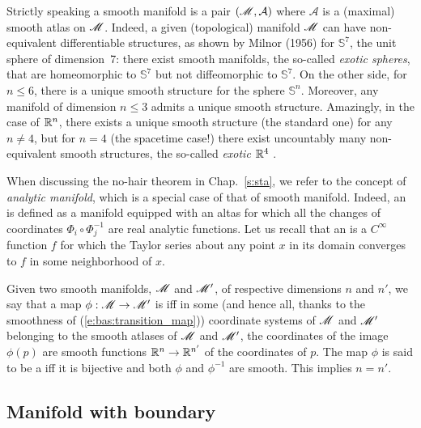 \begin{remark}
Strictly speaking a smooth manifold is a pair $(\mathscr{M},\mathcal{A})$  where
$\mathcal{A}$ is a (maximal) smooth atlas on $\mathscr{M}$.
Indeed, a given (topological) manifold $\mathscr{M}$
can have non-equivalent differentiable structures, as shown by Milnor (1956) \cite{Milno56}
for $\mathbb{S}^7$, the unit sphere of dimension~7: there exist smooth manifolds, the so-called \emph{exotic spheres},
that are homeomorphic to $\mathbb{S}^7$ but not diffeomorphic
to $\mathbb{S}^7$.  On the other side, for $n\leq 6$, there is a unique smooth
structure for the sphere $\mathbb{S}^n$.
Moreover, any manifold of dimension $n\leq 3$ admits a unique smooth structure.
Amazingly, in the case of $\mathbb{R}^n$, there exists a unique smooth structure (the standard one) for any $n\not=4$, but for $n=4$ (the spacetime case!) there exist uncountably many non-equivalent smooth structures, the so-called
\emph{exotic $\mathbb{R}^4$} \cite{Taube87}.
\end{remark}

\begin{remark} \label{r:bas:analytic}
When discussing the no-hair theorem in Chap.~\ref{s:sta}, we
refer to the concept of
\emph{analytic manifold},
which is a special case of that of smooth manifold. Indeed, an
is defined as a manifold equipped with an altas for which all the changes of coordinates
$\Phi_i \circ \Phi_j^{-1}$ are real analytic functions.
Let us recall that an 
is a $C^\infty$ function $f$ for
which the Taylor series about any point $x$ in its domain converges to $f$
in some neighborhood of $x$.
\end{remark}

Given two smooth manifolds, $\mathscr{M}$ and $\mathscr{M}'$, of
respective dimensions $n$ and $n'$, we say that a map
$\phi : \mathscr{M} \rightarrow \mathscr{M}'$ is  iff in some (and hence all, thanks to the smoothness of (\ref{e:bas:transition_map})) coordinate systems
of $\mathscr{M}$ and $\mathscr{M}'$ belonging to the smooth atlases of $\mathscr{M}$ and $\mathscr{M}'$,
the coordinates of the image $\phi(p)$ are smooth functions $\mathbb{R}^n\rightarrow \mathbb{R}^{n'}$ of the coordinates of $p$.
The map $\phi$ is said to be a  iff
it is bijective and both $\phi$ and $\phi^{-1}$ are smooth. This implies $n=n'$.


\subsection{Manifold with boundary} \label{s:bas:manif_boundary}

